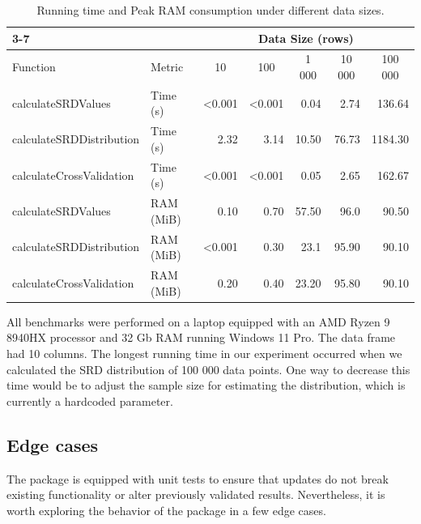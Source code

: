 \begin{table}[]
\begin{tabular}{llrrrrr}
\cline{3-7}
                         &                    & \multicolumn{5}{c}{Data Size (rows)}                               \\ \hline
Function                 & Metric          & \multicolumn{1}{c}{10}              & \multicolumn{1}{c}{100}              & \multicolumn{1}{c}{1 000} & \multicolumn{1}{c}{10 000} & \multicolumn{1}{c}{100 000} \\ \hline
calculateSRDValues        & Time (s) & <0.001 & <0.001 & 0.04 & 2.74  & 136.64 \\
calculateSRDDistribution & Time (s) & 2.32             & 3.14             & 10.50 & 76.73 & 1184.30 \\
calculateCrossValidation & Time (s) & <0.001 & <0.001 & 0.05 & 2.65  & 162.67 \\ \hline
calculateSRDValues        & RAM (MiB)     & 0.10              & 0.70              & 57.50 & 96.0  & 90.50   \\
calculateSRDDistribution & RAM (MiB)     & <0.001 & 0.30              & 23.1 & 95.90  & 90.10   \\
calculateCrossValidation & RAM (MiB)     & 0.20              & 0.40              & 23.20 & 95.80  & 90.10  \\\hline
\end{tabular}
\caption{Running time and Peak RAM consumption under different data sizes.}\label{tab:performance}
\end{table}

All benchmarks were performed on a laptop equipped with an AMD Ryzen 9 8940HX  processor and 32 Gb RAM running Windows 11 Pro. The data frame had 10 columns. The longest running time in our experiment occurred when we calculated the SRD distribution of 100 000 data points. One way to decrease this time would be to adjust the sample size for estimating the distribution, which is currently a hardcoded parameter. %

\subsection{Edge cases}

The package is equipped with unit tests to ensure that updates do not break existing functionality or alter previously validated results. Nevertheless, it is worth exploring the behavior of the package in a few edge cases.

